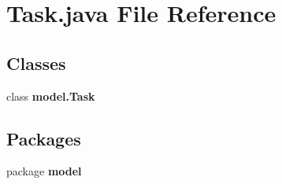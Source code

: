 \section{Task.\+java File Reference}
\label{_task_8java}
\subsection*{Classes}
\begin{DoxyCompactItemize}
\item 
class \textbf{ model.\+Task}
\end{DoxyCompactItemize}
\subsection*{Packages}
\begin{DoxyCompactItemize}
\item 
package \textbf{ model}
\end{DoxyCompactItemize}
